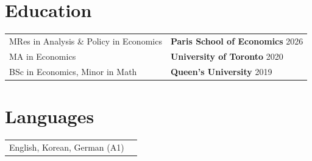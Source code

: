 \documentclass[a4paper,12pt]{article}
\begin{document}
\section{Education}
\begin{tabularx}{\linewidth}{@{}l X@{}} 
MRes in Analysis \& Policy in Economics & \textbf{Paris School of Economics} \hfill 2026 \\

MA in Economics & \textbf{University of Toronto} \hfill 2020 \\ 

BSc in Economics, Minor in Math & \textbf{Queen's University} \hfill 2019 \\
\end{tabularx}

\section{Languages}
\begin{tabularx}{\linewidth}{@{}l X@{}}
\normalsize{English, Korean, German (A1)}\\

\end{tabularx}

\vfill
{}
\end{document}
